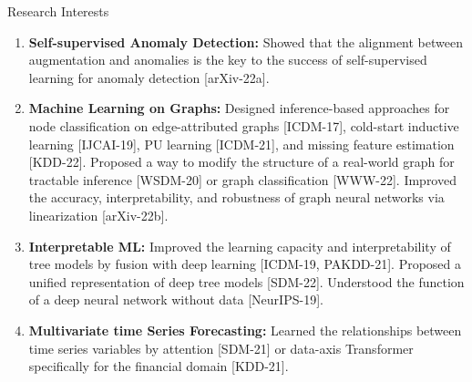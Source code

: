 \documentclass{resume} %
\begin{document}
\begin{rSection}{Research Interests}

\begin{enumerate}[noitemsep, leftmargin=*]
	\item \textbf{Self-supervised Anomaly Detection:} Showed that the alignment between augmentation and anomalies is the key to the success of self-supervised learning for anomaly detection [arXiv-22a].
	\medskip
	\item \textbf{Machine Learning on Graphs:} Designed inference-based approaches for node classification on edge-attributed graphs [ICDM-17], cold-start inductive learning [IJCAI-19], PU learning [ICDM-21], and missing feature estimation [KDD-22].
	Proposed a way to modify the structure of a real-world graph for tractable inference [WSDM-20] or graph classification [WWW-22]. 
	Improved the accuracy, interpretability, and robustness of graph neural networks via linearization [arXiv-22b].
	\medskip
	\item \textbf{Interpretable ML:} Improved the learning capacity and interpretability of tree models by fusion with deep learning [ICDM-19, PAKDD-21].
	Proposed a unified representation of deep tree models [SDM-22].
	Understood the function of a deep neural network without data [NeurIPS-19].
	\medskip
	\item \textbf{Multivariate time Series Forecasting:} Learned the relationships between time series variables by attention [SDM-21] or data-axis Transformer specifically for the financial domain [KDD-21].
\end{enumerate}

\end{rSection}

\end{document}
